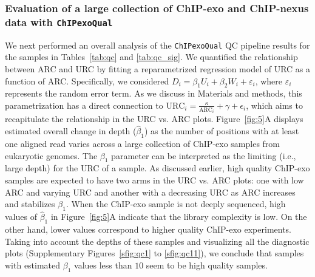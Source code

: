 \documentclass{bmcart}
\newcommand{\pname}[1]{\texttt{ChIPexoQual}}
\newcommand{\RW}[1]{\textcolor{blue}{RW: #1}}
\begin{document}
  
\subsubsection*{Evaluation of a large collection of ChIP-exo and
  ChIP-nexus data with \pname{}}

We next performed an overall analysis of the \pname{} QC pipeline
results for the samples in Tables~\ref{tab:qc} and \ref{tab:qc_sig}.
We quantified the relationship between ARC and URC by fitting a
reparametrized regression model of URC as a function of ARC.
Specifically, we considered $D_i = \beta_1 U_i +\beta_2 W_i
+\varepsilon_i$, where $\varepsilon_i$ represents the random error
term.  As we discuss in Materials and methods, this parametrization
has a direct connection to $\mbox{URC}_i = \frac{\kappa}{\mbox{ARC}_i}
+ \gamma+ \epsilon_i$, which aims to recapitulate the relationship in
the URC vs. ARC plots.
Figure~\ref{fig:5}A displays estimated overall change in depth
($\hat{\beta}_1$) as the number of positions with at least one aligned
read varies across a large collection of ChIP-exo samples from
eukaryotic genomes. The $\beta_1$ parameter can be interpreted as the
limiting (i.e., large depth) for the URC of a sample.
As discussed earlier, high quality ChIP-exo samples are expected to
have two arms in the URC vs. ARC plots: one with low ARC and varying
URC and another with a decreasing URC as ARC increases and stabilizes
$\beta_1$. When the ChIP-exo sample is not deeply sequenced, high
values of $\hat{\beta}_1$ in Figure~\ref{fig:5}A indicate that the
library complexity is low. On the other hand, lower values correspond
to higher quality ChIP-exo experiments. Taking into account the depths
of these samples and visualizing all the diagnostic plots
(Supplementary Figures~\ref{sfig:qc1} to \ref{sfig:qc11}), we conclude
that samples with estimated $\beta_1$ values less than $10$ seem to be
high quality samples.
\end{document}
